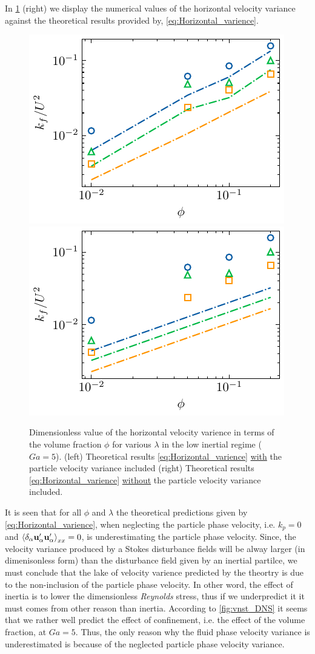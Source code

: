 In \ref{fig:uuxx} (right) we display the numerical values of the horizontal velocity variance against the theoretical results provided by, \ref{eq:Horizontal_varience}. 
\begin{figure}
    \centering
    \includegraphics[height = 0.25\textwidth]{image/HOMOGENEOUS_final/CA/UUxx2_Ga_5.pdf}
    \includegraphics[height = 0.25\textwidth]{image/HOMOGENEOUS_final/CA/UUxx_Ga_5.pdf}
    \caption{Dimensionless value of the horizontal velocity varience  in terms of the volume fraction $\phi$ for various $\lambda$ in the low inertial regime ($Ga = 5$). 
    (left) Theoretical results \eqref{eq:Horizontal_varience} \underline{with} the particle velocity variance included
    (right) Theoretical results  \eqref{eq:Horizontal_varience} \underline{without} the particle velocity variance included. 
    }
    \label{fig:uuxx}
\end{figure}
It is seen that for all $\phi$ and $\lambda$ the theoretical predictions given by \ref{eq:Horizontal_varience}, when neglecting the particle phase velocity, i.e.  $k_p =0$ and $ \left<\delta_\alpha \textbf{u}_\alpha'\textbf{u}_\alpha'\right>_{xx} = 0 $, is underestimating the particle phase velocity. 
Since, the velocity variance produced by a Stokes disturbance fields will be alway larger (in dimenisonless form) than the disturbance field given by an inertial partilce, we must conclude that the lake of velocity varience predicted by the theortry is due to the non-inclusion of the particle phase velocity. 
In other word, the effect of inertia is to lower the dimensionless \textit{Reynolds} stress, thus if we underpredict it it must comes from other reason than inertia. 
According to \ref{fig:vnst_DNS} it seems that we rather well predict the effect of confinement, i.e. the effect of the volume fraction, at $Ga = 5$.
Thus, the only reason why the fluid phase velocity variance is underestimated is because of the neglected particle phase velocity variance.  

